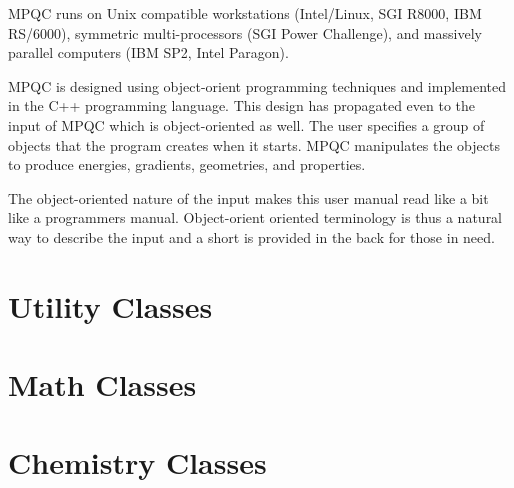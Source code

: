 \documentclass[letterpaper%
              ]{report}
\begin{document}
MPQC runs on Unix compatible workstations (Intel/Linux, SGI R8000,
IBM RS/6000), symmetric multi-processors (SGI Power Challenge),
and massively parallel computers (IBM SP2, Intel Paragon).

MPQC is designed using object-orient programming techniques and
implemented in the C++ programming language.  This design has
propagated even to the input of MPQC which is object-oriented
as well.  The user specifies a group of objects that the program
creates when it starts.  MPQC manipulates the objects to produce
energies, gradients, geometries, and properties.

The object-oriented nature of the input makes this user manual
read like a bit like a programmers manual.  Object-orient oriented
terminology is thus a natural way to describe the input and a
short  is provided in the back for
those in need.







\chapter{Utility Classes}
\label{firstclasschapt}




\chapter{Math Classes}





\chapter{Chemistry Classes}
\label{lastclasschapt}








\begin{htmlonly}

\end{htmlonly}
\end{document}
